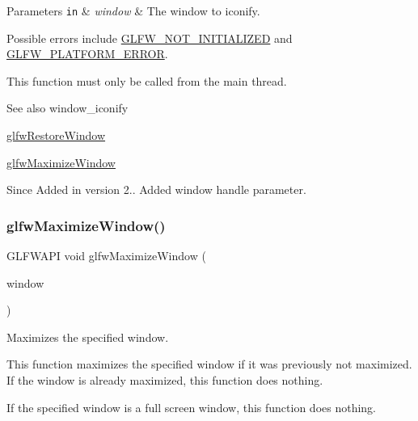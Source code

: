 \begin{DoxyParams}[1]{Parameters}
\mbox{\tt in}  & {\em window} & The window to iconify.\\
\hline
\end{DoxyParams}
Possible errors include \hyperlink{group__errors_ga2374ee02c177f12e1fa76ff3ed15e14a}{G\+L\+F\+W\+\_\+\+N\+O\+T\+\_\+\+I\+N\+I\+T\+I\+A\+L\+I\+Z\+ED} and \hyperlink{group__errors_gad44162d78100ea5e87cdd38426b8c7a1}{G\+L\+F\+W\+\_\+\+P\+L\+A\+T\+F\+O\+R\+M\+\_\+\+E\+R\+R\+OR}.

This function must only be called from the main thread.

\begin{DoxySeeAlso}{See also}
window\+\_\+iconify 

\hyperlink{group__window_ga1e29caf0b819f578b04db52fff17256c}{glfw\+Restore\+Window} 

\hyperlink{group__window_ga4f825a55367d3fabde3d06e7f30128e8}{glfw\+Maximize\+Window}
\end{DoxySeeAlso}
\begin{DoxySince}{Since}
Added in version 2..  Added window handle parameter. 
\end{DoxySince}
\mbox{\label{group__window_ga4f825a55367d3fabde3d06e7f30128e8}} 
\subsubsection{\texorpdfstring{glfw\+Maximize\+Window()}{glfwMaximizeWindow()}}
{\footnotesize\ttfamily G\+L\+F\+W\+A\+PI void glfw\+Maximize\+Window (\begin{DoxyParamCaption}\item[{\hyperlink{group__window_ga3c96d80d363e67d13a41b5d1821f3242}{G\+L\+F\+Wwindow} $\ast$}]{window }\end{DoxyParamCaption})}



Maximizes the specified window. 

This function maximizes the specified window if it was previously not maximized. If the window is already maximized, this function does nothing.

If the specified window is a full screen window, this function does nothing.


